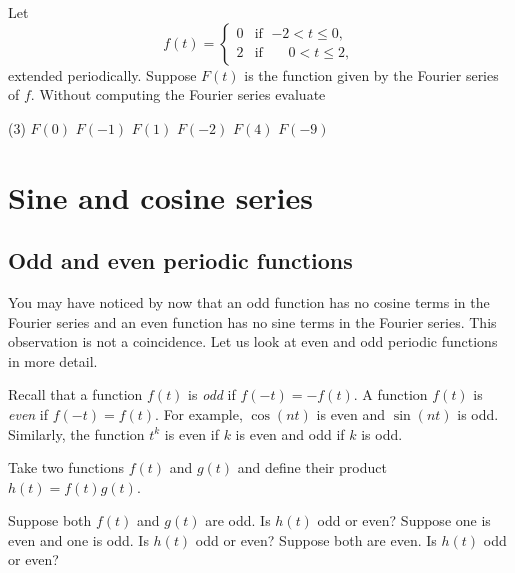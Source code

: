 \begin{exercise}
Let
\begin{equation*}
f(t) = 
\begin{cases}
0 & \text{if } \; {-2} < t \leq 0, \\
2 & \text{if } \; \phantom{-}0 < t \leq 2,
\end{cases}
\end{equation*}
extended periodically.  Suppose $F(t)$ is the function given
by the Fourier series of $f$.  Without computing the Fourier series
evaluate
\begin{tasks}(3)
\task $F(0)$
\task $F(-1)$
\task $F(1)$
\task $F(-2)$
\task $F(4)$
\task $F(-9)$
\end{tasks}
\end{exercise}


\sectionnewpage
\section{Sine and cosine series}
\label{sec:scs}



\subsection{Odd and even periodic functions}

You may have noticed by now that an odd function has no cosine terms in the 
Fourier series and an even function has no sine terms in the Fourier series.
This observation is not a coincidence.  Let us look at even and odd periodic
functions in more detail.

Recall that a function $f(t)$ is \emph{odd} if $f(-t) =
-f(t)$.  A function $f(t)$ is \emph{even} if
$f(-t) = f(t)$.  For example, $\cos (n t)$ is even and $\sin (n t)$ is odd.
Similarly, the function $t^k$ is even if $k$ is even and odd if $k$ is odd.

\begin{exercise}
Take two functions $f(t)$ and $g(t)$ and define their product $h(t) =
f(t)g(t)$.
\begin{tasks}
\task Suppose both $f(t)$ and $g(t)$ are odd.  Is $h(t)$ odd or even?
\task Suppose one is even and one is odd.  Is $h(t)$ odd or even?
\task Suppose both are even.  Is $h(t)$ odd or even?
\end{tasks}
\end{exercise}

